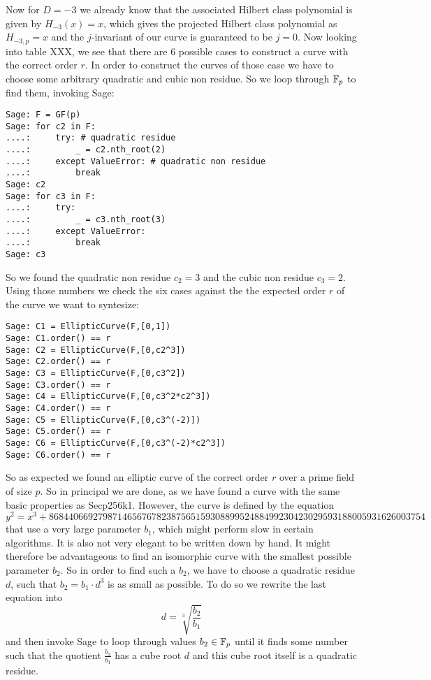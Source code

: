 \begin{example}
Now for $D=-3$ we already know that the associated Hilbert class polynomial is given by $H_{-3}(x)=x$, which gives the projected Hilbert class polynomial as 
$H_{-3,p}=x$ and the $j$-invariant of our curve is guaranteed to be $j=0$. Now looking into table XXX, we see that there are $6$ possible cases to construct a curve with the correct order $r$. In order to construct the curves of those case we have to choose some arbitrary quadratic and cubic non residue. So we loop through $\mathbb{F}_p$ to find them, invoking Sage:
\begin{verbatim}
Sage: F = GF(p)
Sage: for c2 in F:
....:     try: # quadratic residue
....:         _ = c2.nth_root(2)
....:     except ValueError: # quadratic non residue
....:         break
Sage: c2
Sage: for c3 in F:
....:     try:
....:         _ = c3.nth_root(3)
....:     except ValueError:
....:         break
Sage: c3
\end{verbatim}
So we found the quadratic non residue $c_2=3$ and the cubic non residue $c_3=2$. Using those numbers we check the six cases against the the expected order $r$ of the curve we want to syntesize:
\begin{verbatim}
Sage: C1 = EllipticCurve(F,[0,1])
Sage: C1.order() == r
Sage: C2 = EllipticCurve(F,[0,c2^3])
Sage: C2.order() == r
Sage: C3 = EllipticCurve(F,[0,c3^2])
Sage: C3.order() == r
Sage: C4 = EllipticCurve(F,[0,c3^2*c2^3])
Sage: C4.order() == r
Sage: C5 = EllipticCurve(F,[0,c3^(-2)])
Sage: C5.order() == r
Sage: C6 = EllipticCurve(F,[0,c3^(-2)*c2^3])
Sage: C6.order() == r
\end{verbatim}
So as expected we found an elliptic curve of the correct order $r$ over a prime field of size $p$. So in principal we are done, as we have found a curve with the same basic properties as Secp256k1. However, the curve is defined by the equation
$$
\scriptstyle y^2 = x^3 + 86844066927987146567678238756515930889952488499230423029593188005931626003754
$$
that use a very large parameter $b_1$, which might perform slow in certain algorithms. It is also not very elegant to be written down by hand. It might therefore be advantageous to find an isomorphic curve with the smallest possible parameter $b_2$. So in order to find such a $b_2$, we have to choose a quadratic residue $d$, such that $b_2 = b_1\cdot d^3$ is as small as possible. To do so we rewrite the last equation into 
$$
d = \sqrt[3]{\frac{b_2}{b_1}}
$$ 
and then invoke Sage to loop through values $b_2\in \mathbb{F}_p$ until it finds some number such that the quotient $\frac{b_2}{b_1}$ has a cube root $d$ and this cube root itself is a quadratic residue. 

\end{example}
